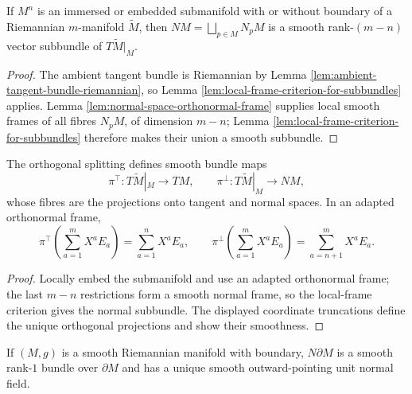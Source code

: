 \begin{proposition}
\label{prop:normal-bundle}
\leanok
{}
If $M^n$ is an immersed or embedded submanifold with or without boundary of a Riemannian $m$-manifold $\widetilde M$, then $NM=\bigsqcup_{p\in M}N_pM$ is a smooth rank-$(m-n)$ vector subbundle of $T\widetilde M|_M$.
\end{proposition}
\begin{proof}
\leanok
{}
\sketch The ambient tangent bundle is Riemannian by Lemma \ref{lem:ambient-tangent-bundle-riemannian}, so Lemma \ref{lem:local-frame-criterion-for-subbundles} applies. Lemma \ref{lem:normal-space-orthonormal-frame} supplies local smooth frames of all fibres $N_pM$, of dimension $m-n$; Lemma \ref{lem:local-frame-criterion-for-subbundles} therefore makes their union a smooth subbundle.
\end{proof}

\begin{remark}
\label{rem:normal-bundle-projections}
The orthogonal splitting defines smooth bundle maps
\[
\pi^\top:T\widetilde M|_M\to TM,\qquad \pi^\perp:T\widetilde M|_M\to NM,
\]
whose fibres are the projections onto tangent and normal spaces. In an adapted orthonormal frame,
\[
\pi^\top\!\left(\sum_{a=1}^mX^aE_a\right)=\sum_{a=1}^nX^aE_a,\qquad
\pi^\perp\!\left(\sum_{a=1}^mX^aE_a\right)=\sum_{a=n+1}^mX^aE_a.
\]
\end{remark}

\begin{proof}
\sketch Locally embed the submanifold and use an adapted orthonormal frame; the last $m-n$ restrictions form a smooth normal frame, so the local-frame criterion gives the normal subbundle. The displayed coordinate truncations define the unique orthogonal projections and show their smoothness.
\end{proof}

\begin{proposition}
\label{prop:outward-pointing-normal}
If $(M,g)$ is a smooth Riemannian manifold with boundary, $N\partial M$ is a smooth rank-$1$ bundle over $\partial M$ and has a unique smooth outward-pointing unit normal field.
\end{proposition}

